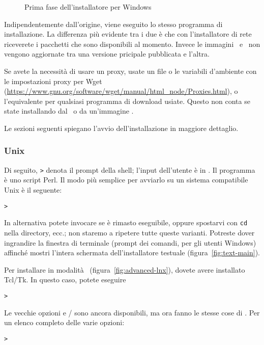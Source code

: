 \documentclass{article}
\begin{document}
\begin{figure}[tb]
\caption{Prima fase dell'installatore  per Windows}\label{fig:nsis}
\end{figure}

Indipendentemente dall'origine, viene eseguito lo stesso programma di
installazione. La differenza più evidente tra i due è che con l'installatore
di rete riceverete i pacchetti che sono disponibili al momento. Invece
le immagini \DVD\ e \ISO\ non vengono aggiornate tra una versione 
pricipale pubblicata e l'altra.

Se avete la necessità di usare un proxy, usate un file
 o le variabili d'ambiente con le impostazioni proxy
per Wget
(\url{https://www.gnu.org/software/wget/manual/html_node/Proxies.html}),
o l'equivalente per qualsiasi programma di download usiate. Questo non
conta se state installando dal \DVD\ o da un'immagine \ISO.

Le sezioni seguenti spiegano l'avvio dell'installazione in maggiore
dettaglio.

\subsubsection{Unix}

Di seguito, \texttt{>} denota il prompt della shell; l'input dell'utente è
in .
Il programma  è uno script Perl. Il modo più semplice
per avviarlo su un sistema compatibile Unix è il seguente:
\begin{alltt}
> 
\end{alltt}
In alternativa potete invocare
 se è rimasto eseguibile,
oppure spostarvi con \texttt{cd} nella directory, ecc.; non staremo a ripetere
tutte queste varianti. Potreste dover ingrandire la finestra di terminale
(prompt dei comandi, per gli utenti Windows)
affinché mostri l'intera schermata dell'installatore testuale
(figura~\ref{fig:text-main}).

Per installare in modalità \GUI\ (figura~\ref{fig:advanced-lnx}),
dovete avere installato Tcl/Tk. In questo caso, potete eseguire
\begin{alltt}
> 
\end{alltt}

Le vecchie opzioni  e / sono ancora
disponibili, ma ora fanno le stesse cose di . Per un elenco
completo delle varie opzioni:
\begin{alltt}
> 
\end{alltt}
\end{document}

